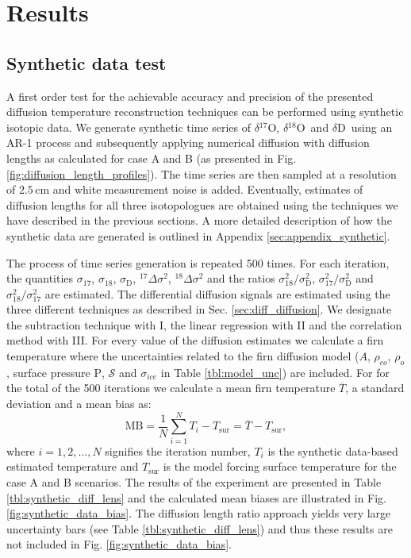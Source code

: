 \documentclass[11pt, draftcls, onecolumn]{IEEEtran} %
\numberwithin{equation}{section}
\numberwithin{table}{section}
\numberwithin{figure}{section}
\newcommand{\delOx}{$\delta{}^{18}\mathrm{O}$}
\newcommand{\delOxb}{$\delta{}^{17}\mathrm{O}$}
\newcommand{\delD}{$\delta\mathrm{D}$}
\begin{document}
\section{Results}\label{sec:results}



\subsection{Synthetic data test} \label{sec:synthetic_results}
A first order test for the achievable accuracy and precision of the presented diffusion temperature reconstruction
techniques can be performed using synthetic isotopic data. 
We generate synthetic time series of 
\delOxb, \delOx~and \delD~using an AR-1 process and subsequently applying numerical diffusion with diffusion 
lengths as calculated for case A and B (as presented in Fig. \ref{fig:diffusion_length_profiles}).
The time series are then sampled at a resolution of $2.5\,\mathrm{cm}$ and white measurement noise is added. Eventually,
estimates of diffusion lengths for all three isotopologues are obtained using the techniques we have described 
in the previous sections. 
A more detailed description of how the synthetic data are generated is outlined in Appendix \ref{sec:appendix_synthetic}.



The process of time series generation is repeated 500 times. 
For each iteration, the quantities $\sigma_{17}$, $\sigma_{18}$,
$\sigma_\mathrm{D}$, ${}^{17}\Delta\sigma^2$, ${}^{18}\Delta\sigma^2$ and 
the ratios $\sigma^2_{18}/\sigma^2_{\mathrm{D}}$,
$\sigma^2_{17}/\sigma^2_{\mathrm{D}}$ and $\sigma^2_{18}/\sigma^2_{17}$ are estimated. 
The differential diffusion signals are estimated 
using the three different techniques as described in Sec. \ref{sec:diff_diffusion}.
We designate the subtraction technique with
I, the linear regression with II and the correlation method with III. 
For every value of the diffusion estimates we calculate a firn temperature where
the uncertainties related to the firn diffusion model ($A$, $\rho_{co}$, $\rho_o$, surface pressure $\mathrm{P}$, $\mathcal{S}$ and $\sigma_{ice}$ in Table \ref{tbl:model_unc}) are included. 
For for the total of the 500 iterations we calculate a mean firn temperature $\overline{T}$, 
a standard deviation and a mean bias as: 
\begin{equation}
\text{MB} = \frac{1}{N} \sum_{i = 1}^{N} T_i - T_{\text{sur}} = \overline{T} - T_{\text{sur}},
\end{equation}
where $i = 1,2,\dots,N$ signifies the iteration number, $T_i$ is the synthetic 
data-based estimated temperature and $T_{\text{sur}}$ is the model forcing  
surface temperature for the case A and B scenarios.
The results of the experiment are presented in Table \ref{tbl:synthetic_diff_lens} and the calculated 
mean biases are illustrated in Fig. \ref{fig:synthetic_data_bias}.
The diffusion length ratio approach yields very large uncertainty bars (see Table \ref{tbl:synthetic_diff_lens}) and thus these results are not 
included in Fig. \ref{fig:synthetic_data_bias}. 
\end{document}
